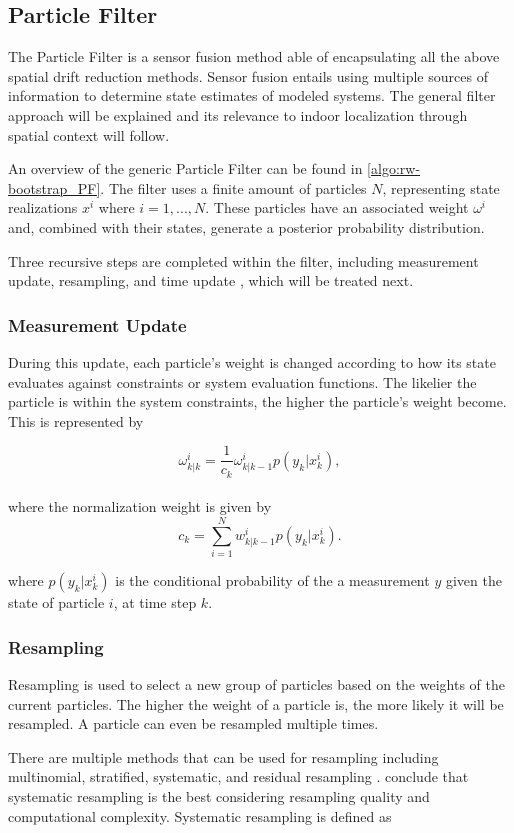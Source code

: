 \subsection{Particle Filter}
\label{sec:rw-pf}

The Particle Filter is a sensor fusion method able of encapsulating all the above spatial drift reduction methods. Sensor fusion entails using multiple sources of information to determine state estimates of modeled systems. The general filter approach will be explained and its relevance to indoor localization through spatial context will follow.\par
An overview of the generic Particle Filter can be found in \cref{algo:rw-bootstrap_PF}.  The filter uses a finite amount of particles $N$, representing state realizations $x^i$ where $i = 1,...,N$. These particles have an associated weight $\omega^i$ and, combined with their states, generate a posterior probability distribution. \par 
Three recursive steps are completed within the filter, including measurement update, resampling, and time update \cite{Wu2019,Woodman2008}, which will be treated next.

\subsubsection{Measurement Update}
During this update, each particle's weight is changed according to how its state evaluates against constraints or system evaluation functions. The likelier the particle is within the system constraints, the higher the particle's weight become. This is represented by

\begin{equation}
	\omega^i_{k|k} = \frac{1}{c_k} \omega^i_{k|k-1} p(y_k|x^i_k),
\end{equation}\\
where the normalization weight is given by
\begin{equation}
	c_{k}=\sum_{i=1}^{N} w_{k | k-1}^{i} p\left(y_{k} | x_{k}^{i}\right).
	\label{eq:PF_probability density}
\end{equation}

where $p(y_k|x_k^i)$ is the conditional probability of the   a measurement $y$ given the state of particle $i$, at time step $k$.

\subsubsection{Resampling}
Resampling is used to select a new group of particles based on the weights of the current particles. The higher the weight of a particle is, the more likely it will be resampled. A particle can even be resampled multiple times. \par 
There are multiple methods that can be used for resampling including multinomial, stratified, systematic, and	residual resampling \cite{hol2006resampling,gustafsson2010statistical}. \citet{hol2006resampling} conclude that  systematic resampling is the best considering resampling quality and computational complexity. Systematic resampling is defined as 

